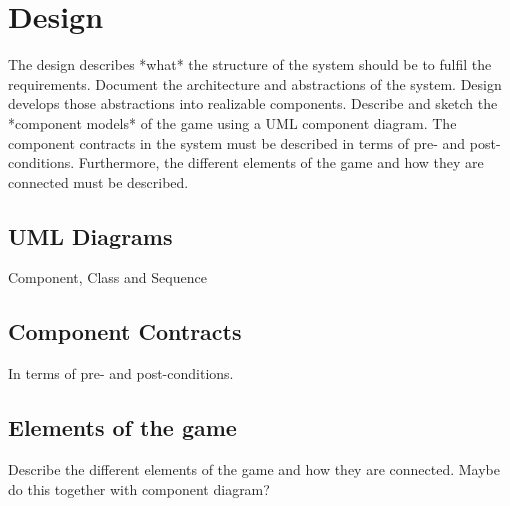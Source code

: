 \section{Design}
The design describes *what* the structure of the system should be to fulfil the requirements.
Document the architecture and abstractions of the system.
Design develops those abstractions into realizable components.
Describe and sketch the *component models* of the game using a UML component diagram.
The component contracts in the system must be described in terms of pre- and post-conditions.
Furthermore, the different elements of the game and how they are connected must be described.

\subsection{UML Diagrams}
Component, Class and Sequence

\subsection{Component Contracts}
In terms of pre- and post-conditions.

\subsection{Elements of the game}
Describe the different elements of the game and how they are connected.
Maybe do this together with component diagram?